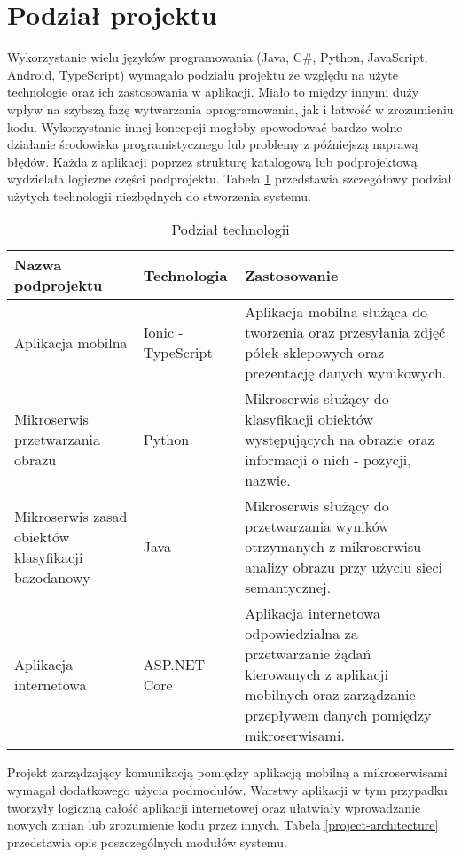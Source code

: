\section{Podział projektu}
{Wykorzystanie wielu języków programowania (Java, C\#, Python, JavaScript, Android, TypeScript) wymagało podziału projektu ze względu na użyte technologie oraz ich zastosowania w aplikacji. Miało to między innymi duży wpływ na szybszą fazę wytwarzania oprogramowania, jak i łatwość w zrozumieniu kodu. Wykorzystanie innej koncepcji mogłoby spowodować bardzo wolne działanie środowiska programistycznego lub problemy z późniejszą naprawą błędów. Każda z aplikacji poprzez strukturę katalogową lub podprojektową wydzielała logiczne części podprojektu. Tabela \ref{architecture} przedstawia szczegółowy podział użytych technologii niezbędnych do stworzenia systemu.
		\begin{table}[htbp]
		\caption{Podział technologii}
		\label{architecture}
		\begin{center}
			\begin{tabular}{ | p{4cm}| p{3cm} | p{6cm} |}
				\hline Nazwa podprojektu & Technologia &  Zastosowanie \\ \hline   
				\hline  Aplikacja mobilna &  Ionic - TypeScript & Aplikacja mobilna służąca do tworzenia oraz przesyłania zdjęć półek sklepowych oraz prezentację danych wynikowych.\\ \hline
				
				\hline  Mikroserwis przetwarzania obrazu & Python & Mikroserwis służący do klasyfikacji obiektów występujących na obrazie oraz informacji o nich - pozycji, nazwie.\\ \hline
				
				\hline Mikroserwis zasad obiektów klasyfikacji  \mbox{bazodanowy} & Java & Mikroserwis służący do przetwarzania wyników otrzymanych z mikroserwisu analizy obrazu przy użyciu sieci semantycznej.\\ \hline
				
				\hline Aplikacja internetowa & ASP.NET Core & Aplikacja internetowa odpowiedzialna za przetwarzanie żądań kierowanych z aplikacji mobilnych oraz zarządzanie przepływem danych pomiędzy mikroserwisami.\\ \hline
			\end{tabular}
		\end{center}
	\end{table}	
	
	
Projekt zarządzający komunikacją pomiędzy aplikacją mobilną a mikroserwisami wymagał dodatkowego użycia podmodułów. Warstwy aplikacji w tym przypadku tworzyły logiczną całość aplikacji internetowej oraz ułatwiały wprowadzanie nowych zmian lub zrozumienie kodu przez innych. Tabela \ref{project-architecture} przedstawia opis poszczególnych modułów systemu.


}
